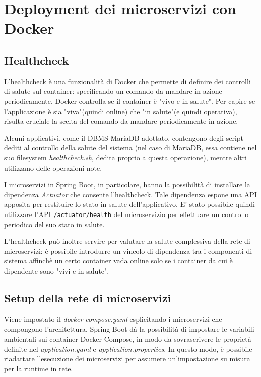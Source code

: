 \section{Deployment dei microservizi con Docker}

\subsection{Healthcheck}
L’healthcheck è una funzionalità di Docker che permette di definire dei controlli di salute sul container: specificando un comando da mandare in azione periodicamente, Docker controlla se il container è "vivo e in salute". Per capire se l'applicazione è sia "viva"(quindi online) che "in salute"(e quindi operativa), risulta cruciale la scelta del comando da mandare periodicamente in azione.

Alcuni applicativi, come il DBMS MariaDB adottato, contengono degli script dediti al controllo della salute del sistema (nel caso di MariaDB, essa contiene nel suo filesystem \textit{healthcheck.sh}, dedita proprio a questa operazione), mentre altri utilizzano delle operazioni note.

I microservizi in Spring Boot, in particolare, hanno la possibilità di installare la dipendenza \textit{Actuator}\cite{halthcheck} che consente l'healthcheck. Tale dipendenza espone una API apposita per restituire lo stato in salute dell'applicativo. E' stato possibile quindi utilizzare l'API \texttt{/actuator/health} del microservizio per effettuare un controllo periodico del suo stato in salute. 

L'healthcheck può inoltre servire per valutare la salute complessiva della rete di microservizi: è possibile introdurre un vincolo di dipendenza tra i componenti di sistema affinchè un certo container vada online solo se i container da cui è dipendente sono "vivi e in salute".

\subsection{Setup della rete di microservizi}
Viene impostato il \textit{docker-compose.yaml} esplicitando i microservizi che compongono l'architettura. Spring Boot dà la possibilità di impostare le variabili ambientali sui container Docker Compose, in modo da sovrascrivere le proprietà definite nel \textit{application.yaml} e \textit{application.properties}. 
In questo modo, è possibile riadattare l'esecuzione dei microservizi per assumere un'impostazione su misura per la runtime in rete.

